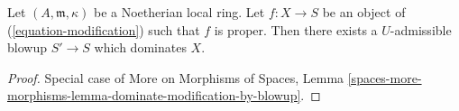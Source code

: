 \begin{lemma}
\label{lemma-dominate-by-admissible-blowup}
Let $(A, \mathfrak m, \kappa)$ be a Noetherian local ring.
Let $f : X \to S$ be an object of (\ref{equation-modification})
such that $f$ is proper.
Then there exists a $U$-admissible blowup $S' \to S$
which dominates $X$.
\end{lemma}

\begin{proof}
Special case of More on Morphisms of Spaces,
Lemma \ref{spaces-more-morphisms-lemma-dominate-modification-by-blowup}.
\end{proof}











